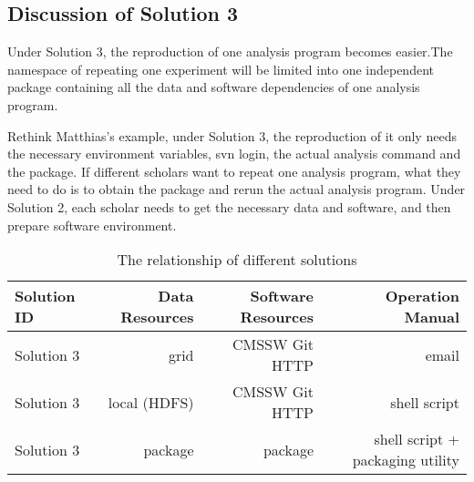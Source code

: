 \documentclass{acm_proc_article-sp}
\begin{document}
\subsection{Discussion of Solution 3}
Under Solution 3, the reproduction of one analysis program becomes easier.The namespace of repeating one experiment will be limited into one independent package containing all the data and software dependencies of one analysis program. 

Rethink Matthias's example, under Solution 3, the reproduction of it only needs the necessary environment variables, svn login,  the actual analysis command and the package. If different scholars want to repeat one analysis program, what they need to do is to obtain the package and rerun the actual analysis program. Under Solution 2, each scholar needs to get the necessary data and software, and then prepare software environment. 

\begin{table*}
    \centering
    \begin{tabular}{|l|r|r|r|}
        \hline
        Solution ID & Data Resources & Software Resources & Operation Manual \\ \hline
        Solution 3& grid & CMSSW Git HTTP & email \\ \hline
        Solution 3& local (HDFS) & CMSSW Git HTTP & shell script \\ \hline
        Solution 3& package & package & shell script + packaging utility \\ \hline
    \end{tabular}
    \caption{The relationship of different solutions}
    \label{table:relationship}
\end{table*}



\end{document}
